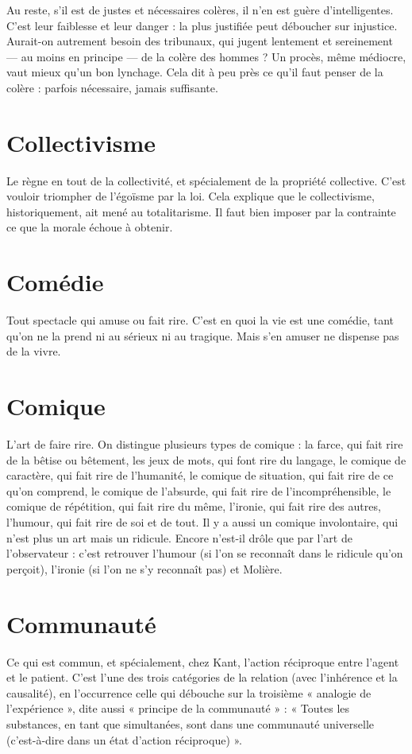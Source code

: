 Au reste, s’il est de justes et nécessaires colères, il n’en est guère d’intelligentes.
C’est leur faiblesse et leur danger : la plus justifiée peut déboucher
sur injustice. Aurait-on autrement besoin des tribunaux, qui jugent lentement
et sereinement — au moins en principe — de la colère des hommes ?
Un procès, même médiocre, vaut mieux qu’un bon lynchage. Cela dit à
peu près ce qu’il faut penser de la colère : parfois nécessaire, jamais suffisante.

\section{Collectivisme}
Le règne en tout de la collectivité, et spécialement de la
propriété collective. C’est vouloir triompher de l’égoïsme
par la loi. Cela explique que le collectivisme, historiquement, ait mené au totalitarisme.
Il faut bien imposer par la contrainte ce que la morale échoue à
obtenir.

\section{Comédie}
Tout spectacle qui amuse ou fait rire. C’est en quoi la vie est
une comédie, tant qu’on ne la prend ni au sérieux ni au tragique.
Mais s’en amuser ne dispense pas de la vivre.

\section{Comique}
L'art de faire rire. On distingue plusieurs types de comique : la
farce, qui fait rire de la bêtise ou bêtement, les jeux de mots,
qui font rire du langage, le comique de caractère, qui fait rire de l'humanité, le
comique de situation, qui fait rire de ce qu’on comprend, le comique de
l'absurde, qui fait rire de l’incompréhensible, le comique de répétition, qui fait
rire du même, l'ironie, qui fait rire des autres, l'humour, qui fait rire de soi et
de tout. Il y a aussi un comique involontaire, qui n’est plus un art mais un
ridicule. Encore n'est-il drôle que par l’art de l’observateur : c’est retrouver
l’humour (si l’on se reconnaît dans le ridicule qu’on perçoit), l'ironie (si l’on ne
s’y reconnaît pas) et Molière.

\section{Communauté}
Ce qui est commun, et spécialement, chez Kant, l’action
réciproque entre l’agent et le patient. C’est l’une des trois
catégories de la relation (avec l’inhérence et la causalité), en l’occurrence celle
qui débouche sur la troisième « analogie de l’expérience », dite aussi « principe
de la communauté » : « Toutes les substances, en tant que simultanées, sont
dans une communauté universelle (c’est-à-dire dans un état d’action réciproque) ».

